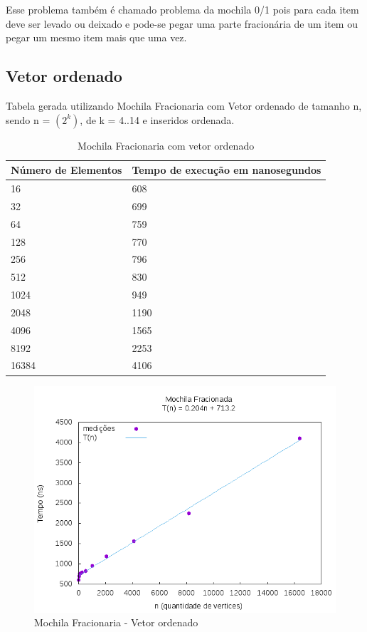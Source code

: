 \documentclass[12pt,a4paper,twoside]{report}
\begin{document}
Esse problema também é chamado problema da mochila 0/1 pois para
cada item deve ser levado ou deixado e pode-se pegar uma parte
fracionária de um item ou pegar um mesmo item mais que uma vez.

\subsection{Vetor ordenado}
Tabela gerada utilizando Mochila Fracionaria com Vetor ordenado de tamanho n, sendo n = $(2^k)$, de k = 4..14 e inseridos ordenada.
\begin{table}[H]
\centering
\caption{Mochila Fracionaria com vetor ordenado}
\label{my-label}
\begin{tabular}{|l|l|}
\hline
\multicolumn{1}{|c|}{\textbf{Número de Elementos}} & \multicolumn{1}{c|}{\textbf{Tempo de execução em nanosegundos}} \\ \hline
16 & 608 \\ \hline
32 & 699 \\ \hline
64 & 759 \\ \hline
128 & 770 \\ \hline
256 & 796 \\ \hline
512 & 830 \\ \hline
1024 & 949 \\ \hline
2048 & 1190 \\ \hline
4096 & 1565 \\ \hline
8192 & 2253 \\ \hline
16384 & 4106 \\ \hline
\end{tabular}
\end{table}

\begin{figure}[H]
    \centering
    \includegraphics[width=0.7\linewidth]{graficos/Mochila Fracionada/MochilaFracionada.png}
  \caption{Mochila Fracionaria - Vetor ordenado}
\end{figure}
\end{document}
